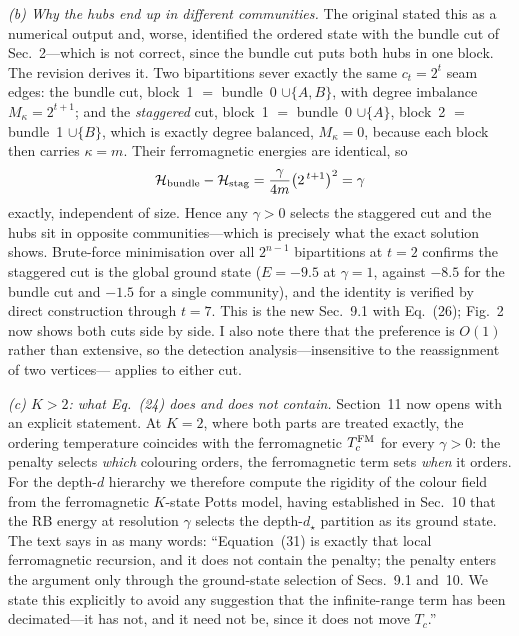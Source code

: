 \documentclass[11pt]{article}
\begin{document}
\emph{(b) Why the hubs end up in different communities.} The original stated
this as a numerical output and, worse, identified the ordered state with the
bundle cut of Sec.~2---which is not correct, since the bundle cut puts both
hubs in one block. The revision derives it. Two bipartitions sever exactly the
same $c_t=2^t$ seam edges: the bundle cut, block~1 $=$ bundle~0 $\cup\{A,B\}$,
with degree imbalance $M_\kappa=2^{t+1}$; and the \emph{staggered} cut,
block~1 $=$ bundle~0 $\cup\{A\}$, block~2 $=$ bundle~1 $\cup\{B\}$, which is
exactly degree balanced, $M_\kappa=0$, because each block then carries
$\kappa=m$. Their ferromagnetic energies are identical, so
\[
  \mathcal{H}_{\rm bundle}-\mathcal{H}_{\rm stag}
   =\frac{\gamma}{4m}\big(2^{\,t+1}\big)^2=\gamma
\]
exactly, independent of size. Hence any $\gamma>0$ selects the staggered cut
and the hubs sit in opposite communities---which is precisely what the exact
solution shows. Brute-force minimisation over all $2^{n-1}$ bipartitions at
$t=2$ confirms the staggered cut is the global ground state ($E=-9.5$ at
$\gamma=1$, against $-8.5$ for the bundle cut and $-1.5$ for a single
community), and the identity is verified by direct construction through $t=7$.
This is the new Sec.~9.1 with Eq.~(26); Fig.~2 now shows both cuts side by
side. I also note there that the preference is $O(1)$ rather than extensive, so
the detection analysis---insensitive to the reassignment of two vertices---
applies to either cut.

\emph{(c) $K>2$: what Eq.~(24) does and does not contain.} Section~11 now opens
with an explicit statement. At $K=2$, where both parts are treated exactly, the
ordering temperature coincides with the ferromagnetic $T_c^{\rm FM}$ for every
$\gamma>0$: the penalty selects \emph{which} colouring orders, the
ferromagnetic term sets \emph{when} it orders. For the depth-$d$ hierarchy we
therefore compute the rigidity of the colour field from the ferromagnetic
$K$-state Potts model, having established in Sec.~10 that the RB energy at
resolution $\gamma$ selects the depth-$d_\star$ partition as its ground state.
The text says in as many words: ``Equation~(31) is exactly that local
ferromagnetic recursion, and it does not contain the penalty; the penalty
enters the argument only through the ground-state selection of Secs.~9.1
and~10. We state this explicitly to avoid any suggestion that the
infinite-range term has been decimated---it has not, and it need not be, since
it does not move $T_c$.''
\end{document}
